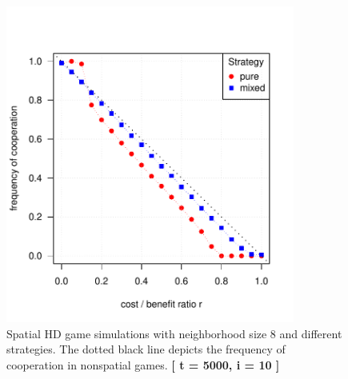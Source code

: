 \begin{figure}[H]
	\centering 
	\includegraphics[width=9.5cm]{task3_multiplot}
	\caption{Spatial HD game simulations with neighborhood size 8 and different strategies. The dotted black line depicts the frequency of cooperation in nonspatial games.  \textbf{[ t = 5000, i = 10 ]} }\label{fig: task3_multiplot}
\end{figure}





